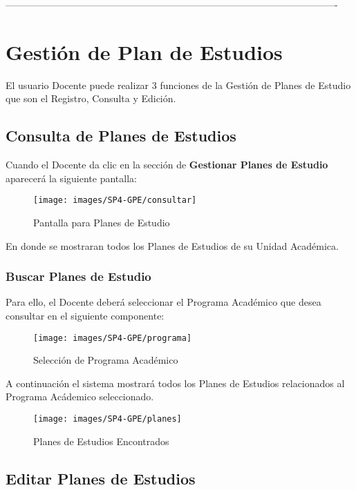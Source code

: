  -------------------------------------------------------------------------------------------------------

\chapter{Gestión de Plan de Estudios}
El usuario Docente puede realizar 3 funciones de la Gestión de Planes de Estudio que son el Registro, Consulta y Edición.
\section{Consulta de Planes de Estudios}
Cuando el Docente da clic en la sección de \textbf{Gestionar Planes de Estudio} aparecerá la siguiente pantalla:


\begin{figure}[!hbtp]
	\centering
	\hypertarget{consultarPE}{\texttt{[image: images/SP4-GPE/consultar]}}
	\caption{Pantalla para Planes de Estudio}
	\label{consultarPE}
\end{figure}

En donde se mostraran todos los Planes de Estudios de su Unidad Académica.
\newpage
\subsection{Buscar Planes de Estudio}

Para ello, el Docente deberá seleccionar el Programa Académico que desea consultar en el siguiente componente:

\begin{figure}[!hbtp]
	\centering
	\hypertarget{academico}{\texttt{[image: images/SP4-GPE/programa]}}
	\caption{Selección de Programa Académico}
	\label{academico}
\end{figure}

A continuación el sistema mostrará todos los Planes de Estudios relacionados al Programa Acádemico seleccionado.
\begin{figure}[!hbtp]
	\centering
	\hypertarget{planes}{\texttt{[image: images/SP4-GPE/planes]}}
	\caption{Planes de Estudios Encontrados}
	\label{planes}
\end{figure}
\newpage
\section{Editar Planes de Estudios}

